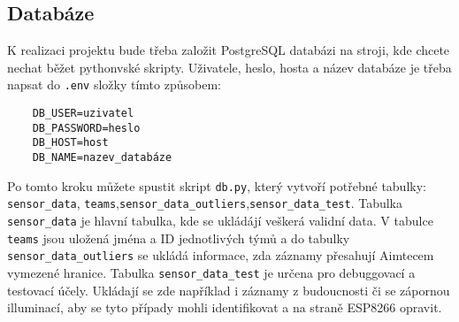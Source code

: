 \subsection{Databáze}
\label{ssec:db}
K realizaci projektu bude třeba založit PostgreSQL databázi na stroji, kde chcete nechat běžet pythonvské skripty. Uživatele, heslo, hosta a název databáze je třeba napsat do \verb|.env| složky tímto způsobem:
\begin{verbatim}
    DB_USER=uzivatel
    DB_PASSWORD=heslo
    DB_HOST=host
    DB_NAME=nazev_databáze
\end{verbatim}
Po tomto kroku můžete spustit skript \verb|db.py|, který vytvoří potřebné tabulky: \verb|sensor_data|, \verb|teams|,\newline \verb|sensor_data_outliers|,\verb|sensor_data_test|.
Tabulka \verb|sensor_data| je hlavní tabulka, kde se ukládájí veškerá validní data. V tabulce \verb|teams| jsou uložená jména a ID jednotlivých týmů a do tabulky \verb|sensor_data_outliers| se ukládá informace, zda záznamy přesahují Aimtecem vymezené hranice.
Tabulka \verb|sensor_data_test| je určena pro debuggovací a testovací účely. Ukládají se zde například i záznamy z budoucnosti či se zápornou illuminací, aby se tyto případy mohli identifikovat a na straně ESP8266 opravit. 